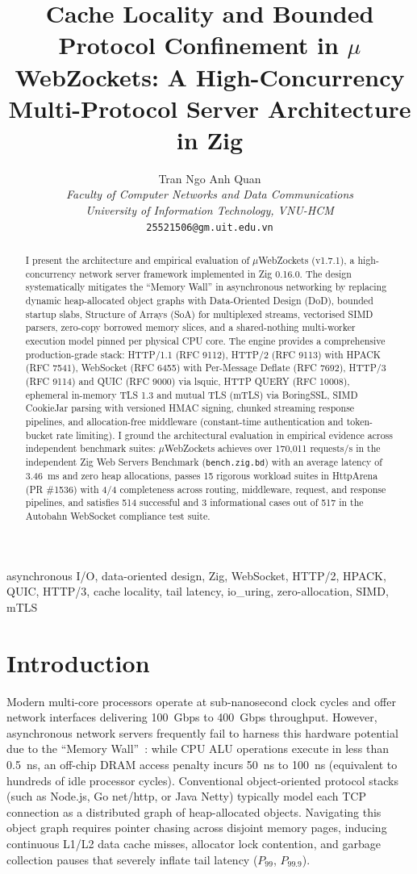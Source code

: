 \documentclass[journal]{IEEEtran}
\title{Cache Locality and Bounded Protocol Confinement in \ensuremath{\mu}WebZockets: A High-Concurrency Multi-Protocol Server Architecture in Zig}
\author{Tran Ngo Anh Quan\\
\textit{Faculty of Computer Networks and Data Communications}\\
\textit{University of Information Technology, VNU-HCM}\\
\texttt{25521506@gm.uit.edu.vn}}
\begin{document}
\maketitle

\begin{abstract}
I present the architecture and empirical evaluation of \ensuremath{\mu}WebZockets (v1.7.1), a high-concurrency network server framework implemented in Zig 0.16.0. The design systematically mitigates the ``Memory Wall'' in asynchronous networking by replacing dynamic heap-allocated object graphs with Data-Oriented Design (DoD), bounded startup slabs, Structure of Arrays (SoA) for multiplexed streams, vectorised SIMD parsers, zero-copy borrowed memory slices, and a shared-nothing multi-worker execution model pinned per physical CPU core. The engine provides a comprehensive production-grade stack: HTTP/1.1 (RFC 9112), HTTP/2 (RFC 9113) with HPACK (RFC 7541), WebSocket (RFC 6455) with Per-Message Deflate (RFC 7692), HTTP/3 (RFC 9114) and QUIC (RFC 9000) via lsquic, HTTP QUERY (RFC 10008), ephemeral in-memory TLS 1.3 and mutual TLS (mTLS) via BoringSSL, SIMD CookieJar parsing with versioned HMAC signing, chunked streaming response pipelines, and allocation-free middleware (constant-time authentication and token-bucket rate limiting). I ground the architectural evaluation in empirical evidence across independent benchmark suites: \ensuremath{\mu}WebZockets achieves over 170,011 requests/s in the independent Zig Web Servers Benchmark (\texttt{bench.zig.bd}) with an average latency of 3.46~ms and zero heap allocations, passes 15 rigorous workload suites in HttpArena (PR \#1536) with 4/4 completeness across routing, middleware, request, and response pipelines, and satisfies 514 successful and 3 informational cases out of 517 in the Autobahn WebSocket compliance test suite.
\end{abstract}

\begin{IEEEkeywords}
asynchronous I/O, data-oriented design, Zig, WebSocket, HTTP/2, HPACK, QUIC, HTTP/3, cache locality, tail latency, io\_uring, zero-allocation, SIMD, mTLS
\end{IEEEkeywords}

\section{Introduction}

Modern multi-core processors operate at sub-nanosecond clock cycles and offer network interfaces delivering 100~Gbps to 400~Gbps throughput. However, asynchronous network servers frequently fail to harness this hardware potential due to the ``Memory Wall''~\cite{drepper_memory}: while CPU ALU operations execute in less than 0.5~ns, an off-chip DRAM access penalty incurs 50~ns to 100~ns (equivalent to hundreds of idle processor cycles). Conventional object-oriented protocol stacks (such as Node.js, Go net/http, or Java Netty) typically model each TCP connection as a distributed graph of heap-allocated objects. Navigating this object graph requires pointer chasing across disjoint memory pages, inducing continuous L1/L2 data cache misses, allocator lock contention, and garbage collection pauses that severely inflate tail latency ($P_{99}$, $P_{99.9}$).
\end{document}
